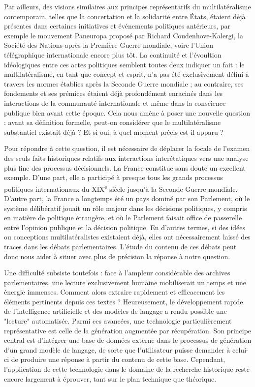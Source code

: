 \documentclass[a4paper,twoside,12pt]{book}
\begin{document}
Par ailleurs, des visions similaires aux principes représentatifs du multilatéralisme contemporain, telles que la concertation et la solidarité entre États, étaient déjà présentes dans certaines initiatives et événements politiques antérieurs, par exemple le mouvement Paneuropa proposé par Richard Coudenhove-Kalergi, la Société des Nations après la Première Guerre mondiale, voire l'Union télégraphique internationale encore plus tôt. La continuité et l'évoultion idéologiques entre ces actes politiques semblent toutes deux indiquer un fait : le multilatéralisme, en tant que concept et esprit, n'a pas été exclusivement défini à travers les normes établies après la Seconde Guerre mondiale ; au contraire, ses fondements et ses prémices étaient déjà profondément enracinés dans les interactions de la communauté internationale et même dans la conscience publique bien avant cette époque. Cela nous amène à poser une nouvelle question : avant sa définition formelle, peut-on considérer que le multilatéralisme substantiel existait déjà ? Et si oui, à quel moment précis est-il apparu ?

Pour répondre à cette question, il est nécessaire de déplacer la focale de l'examen des seuls faits historiques relatifs aux interactions interétatiques vers une analyse plus fine des processus décisionnels. La France constitue sans doute un excellent exemple. D'une part, elle a participé à presque tous les grands processus politiques internationaux du XIX\textsuperscript{e} siècle jusqu'à la Seconde Guerre mondiale. D'autre part, la France a longtemps été un pays dominé par son Parlement, où le système délibératif jouait un rôle majeur dans les décisions politiques, y compris en matière de politique étrangère, et où le Parlement faisait office de passerelle entre l'opinion publique et la décision politique. En d'autres termes, si des idées ou conceptions multilatéralistes existaient déjà, elles ont nécessairement laissé des traces dans les débats parlementaires. L'étude du contenu de ces débats peut donc nous aider à situer avec plus de précision la réponse à notre question.

Une difficulté subsiste toutefois : face à l'ampleur considérable des archives parlementaires, une lecture exclusivement humaine mobiliserait un temps et une énergie immenses. Comment alors extraire rapidement et efficacement les éléments pertinents depuis ces textes ? Heureusement, le développement rapide de l'intelligence artificielle et des modèles de langage a rendu possible une "lecture" automatisée. Parmi ces avancées, une technologie particulièrement représentative est celle de la génération augmentée par récupération. Son principe central est d'intégrer une base de données externe dans le processus de génération d'un grand modèle de langage, de sorte que l'utilisateur puisse demander à celui-ci de produire une réponse à partir du contenu de cette base. Cependant, l'application de cette technologie dans le domaine de la recherche historique reste encore largement à éprouver, tant sur le plan technique que théorique.
\end{document}
